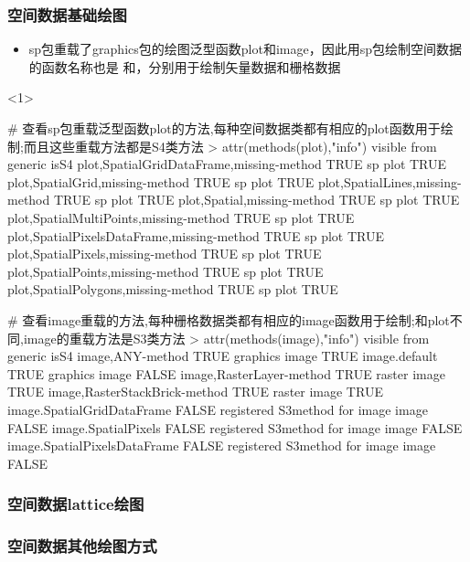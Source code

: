 \subsubsection{空间数据基础绘图}
\begin{frame}[t,fragile]{\subsecname}
\begin{itemize} 
\item<1-> sp包重载了graphics包的绘图泛型函数plot和image，因此用sp包绘制空间数据的函数名称也是
和，分别用于绘制矢量数据和栅格数据
\end{itemize}

\begin{overlayarea}{\textwidth}{\textheight}
\begin{onlyenv}<1>
\begin{rcode}
# 查看sp包重载泛型函数plot的方法,每种空间数据类都有相应的plot函数用于绘制;而且这些重载方法都是S4类方法
> attr(methods(plot),"info")
                                           visible  from  generic  isS4  
plot,SpatialGridDataFrame,missing-method      TRUE    sp  plot     TRUE 
plot,SpatialGrid,missing-method               TRUE    sp  plot     TRUE
plot,SpatialLines,missing-method              TRUE    sp  plot     TRUE
plot,Spatial,missing-method                   TRUE    sp  plot     TRUE
plot,SpatialMultiPoints,missing-method        TRUE    sp  plot     TRUE
plot,SpatialPixelsDataFrame,missing-method    TRUE    sp  plot     TRUE
plot,SpatialPixels,missing-method             TRUE    sp  plot     TRUE
plot,SpatialPoints,missing-method             TRUE    sp  plot     TRUE
plot,SpatialPolygons,missing-method           TRUE    sp  plot     TRUE

# 查看image重载的方法,每种栅格数据类都有相应的image函数用于绘制;和plot不同,image的重载方法是S3类方法
> attr(methods(image),"info")
                              visible                          from generic  isS4
image,ANY-method                 TRUE                      graphics   image  TRUE
image.default                    TRUE                      graphics   image FALSE
image,RasterLayer-method         TRUE                        raster   image  TRUE
image,RasterStackBrick-method    TRUE                        raster   image  TRUE
image.SpatialGridDataFrame      FALSE registered S3method for image   image FALSE
image.SpatialPixels             FALSE registered S3method for image   image FALSE
image.SpatialPixelsDataFrame    FALSE registered S3method for image   image FALSE
\end{rcode}
\end{onlyenv}
\end{overlayarea}
\end{frame}

\subsubsection{空间数据lattice绘图}

\subsubsection{空间数据其他绘图方式}